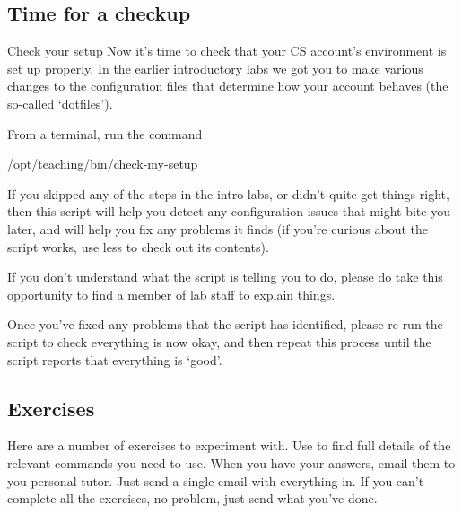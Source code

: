 \subsection{Time for a checkup}
\label{sec:time-checkup}

\begin{roadblock}{Check your setup}
Now it's time to check that your CS account's environment is set up properly. In the earlier
introductory labs we got you to make various changes to the configuration files that determine how your account behaves (the so-called `dotfiles').


From a terminal, run the command

\begin{ttoutenv}
/opt/teaching/bin/check-my-setup
  \end{ttoutenv}


If you skipped any of the steps in the intro labs, or didn't quite get things right, then this script will help you detect any configuration issues that might bite you later, and will help you fix any problems it finds (if you're curious about the script works, use less to check out its contents).


If you don't understand what the script is telling you to do, please do take this opportunity to find a member of lab staff to explain things.

Once you've fixed any problems that the script has identified, please re-run the script to check everything is now okay, and then repeat this process until the script reports that everything is `good'.
  
\end{roadblock}

\subsection{Exercises}

Here are a number of exercises to experiment with. Use 
to find full details of the relevant commands you need to use. When you
have your answers, email them to you personal tutor. Just send a
single email with everything in. If you can't complete all the
exercises, no problem, just send what you've done.

